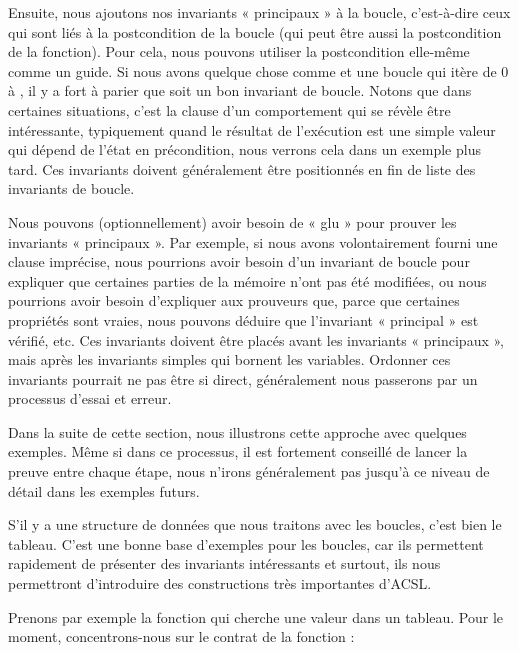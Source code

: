 Ensuite, nous ajoutons nos invariants « principaux » à la boucle, c'est-à-dire
ceux qui sont liés à la postcondition de la boucle (qui peut être aussi la
postcondition de la fonction). Pour cela, nous pouvons utiliser la postcondition
elle-même comme un guide. Si nous avons quelque chose comme
 et une boucle qui itère  de 0 à
, il y a fort à parier que  soit
un bon invariant de boucle. Notons que dans certaines situations, c'est la
clause  d'un comportement qui se révèle être intéressante,
typiquement quand le résultat de l'exécution est une simple valeur qui dépend
de l'état en précondition, nous verrons cela dans un exemple plus tard. Ces
invariants doivent généralement être positionnés en fin de liste des invariants
de boucle.


Nous pouvons (optionnellement) avoir besoin de « glu » pour prouver les
invariants « principaux ». Par exemple, si nous avons volontairement fourni
une clause  imprécise, nous pourrions avoir besoin
d'un invariant de boucle pour expliquer que certaines parties de la mémoire
n'ont pas été modifiées, ou nous pourrions avoir besoin d'expliquer aux
prouveurs que, parce que certaines propriétés sont vraies, nous pouvons déduire
que l'invariant « principal » est vérifié, etc. Ces invariants doivent être
placés avant les invariants « principaux », mais après les invariants simples
qui bornent les variables. Ordonner ces invariants pourrait ne pas être si
direct, généralement nous passerons par un processus d'essai et erreur.


Dans la suite de cette section, nous illustrons cette approche avec quelques
exemples. Même si dans ce processus, il est fortement conseillé de lancer la
preuve entre chaque étape, nous n'irons généralement pas jusqu'à ce niveau de
détail dans les exemples futurs.


\label{l3:statements-loops-examples-ro}


S'il y a une structure de données que nous traitons avec les boucles, c'est bien
le tableau. C'est une bonne base d'exemples pour les boucles, car ils permettent
rapidement de présenter des invariants intéressants et surtout, ils nous
permettront d'introduire des constructions très importantes d'ACSL.


Prenons par exemple la fonction qui cherche une valeur dans un tableau. Pour le
moment, concentrons-nous sur le contrat de la fonction :


